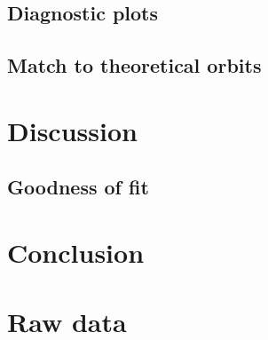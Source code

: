 \documentclass[]{report}
\begin{document}
\section{Diagnostic plots}

\section{Match to theoretical orbits}



\chapter{Discussion}

\section{Goodness of fit}



\chapter{Conclusion}


\appendix
\chapter{Raw data}

%
%
%
%
%


\end{document}
